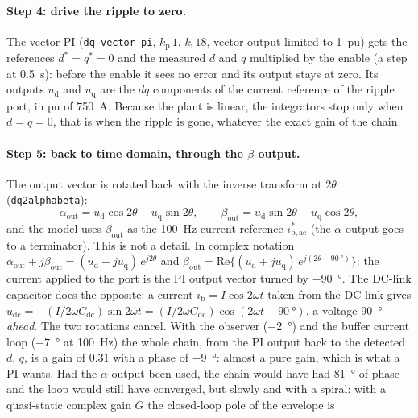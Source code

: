 \documentclass[11pt,a4paper]{scrartcl}
\newcommand{\ped}[1]{_{\mathrm{#1}}}
\newcommand{\code}[1]{\texttt{#1}}
\begin{document}
\begin{onehalfspace}
\paragraph{Step 4: drive the ripple to zero.}
The vector PI (\code{dq\_vector\_pi}, $k\ped{p}\,1$, $k\ped{i}\,18$, vector output limited to \SI{1}{pu}) gets the references $d^* = q^* = 0$ and the measured $d$ and $q$ multiplied by the enable (a step at \SI{0.5}{\second}): before the enable it sees no error and its output stays at zero. Its outputs $u\ped{d}$ and $u\ped{q}$ are the $dq$ components of the current reference of the ripple port, in pu of \SI{750}{\ampere}. Because the plant is linear, the integrators stop only when $d = q = 0$, that is when the ripple is gone, whatever the exact gain of the chain.

\paragraph{Step 5: back to time domain, through the $\beta$ output.}
The output vector is rotated back with the inverse transform at $2\theta$ (\code{dq2alphabeta}):
\begin{equation}
	\alpha\ped{out} = u\ped{d}\cos 2\theta - u\ped{q}\sin 2\theta, \qquad \beta\ped{out} = u\ped{d}\sin 2\theta + u\ped{q}\cos 2\theta,
\end{equation}
and the model uses $\beta\ped{out}$ as the \SI{100}{\hertz} current reference $i\ped{b,ac}^*$ (the $\alpha$ output goes to a terminator). This is not a detail. In complex notation $\alpha\ped{out} + j\beta\ped{out} = (u\ped{d} + j u\ped{q})\, e^{j 2\theta}$ and $\beta\ped{out} = \mathrm{Re}\{(u\ped{d} + j u\ped{q})\, e^{j(2\theta - \SI{90}{\degree})}\}$: the current applied to the port is the PI output vector turned by \SI{-90}{\degree}. The DC-link capacitor does the opposite: a current $i\ped{b} = I\cos 2\omega t$ taken from the DC link gives $u\ped{dc} = -(I/2\omega C\ped{dc})\sin 2\omega t = (I/2\omega C\ped{dc})\cos(2\omega t + \SI{90}{\degree})$, a voltage \SI{90}{\degree} \emph{ahead}. The two rotations cancel. With the observer (\SI{-2}{\degree}) and the buffer current loop (\SI{-7}{\degree} at \SI{100}{\hertz}) the whole chain, from the PI output back to the detected $d$, $q$, is a gain of 0.31 with a phase of \SI{-9}{\degree}: almost a pure gain, which is what a PI wants. Had the $\alpha$ output been used, the chain would have had \SI{+81}{\degree} of phase and the loop would still have converged, but slowly and with a spiral: with a quasi-static complex gain $G$ the closed-loop pole of the envelope is

\end{onehalfspace}
\end{document}
